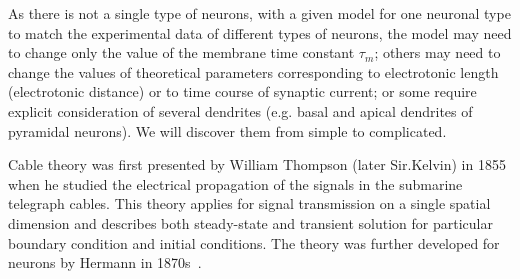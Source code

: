 \begin{framed}

As there is not a single type of neurons, with a given model for one neuronal
type to match the experimental data of different types of neurons, the model may
need to change only the value of the membrane time constant $\tau_m$; others may
need to change the values of theoretical parameters corresponding to
electrotonic length (electrotonic distance) or to time course of synaptic
current; or some require explicit consideration of several dendrites (e.g. basal
and apical dendrites of pyramidal neurons). We will discover them from simple to
complicated.
\end{framed}



\cite{finn2002hnm}Cable theory was first presented by William Thompson
(later Sir.Kelvin) in 1855 when he studied the electrical propagation
of the signals in the submarine telegraph cables. This theory applies
for signal transmission on a single spatial dimension and describes
both steady-state and transient solution for particular boundary
condition and initial conditions.  The theory was further developed
for neurons by Hermann in 1870s~\cite{hermann1879hdp}.

